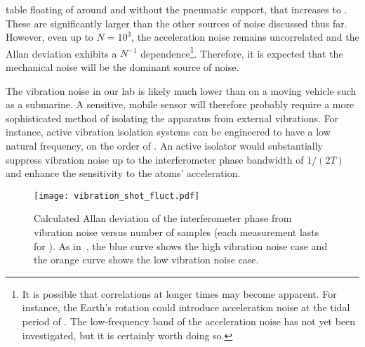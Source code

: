 table floating of around  and without the
pneumatic support, that increases to
. These are significantly larger than the other sources of noise discussed thus
far. However, even up to $N = 10^3$, the acceleration noise remains uncorrelated and
the Allan deviation exhibits a $N^{-1}$
dependence\footnote{It is possible that correlations at longer times may
become apparent. For instance, the Earth's rotation could introduce
acceleration noise at the tidal period of . The
low-frequency band of the acceleration noise has not yet been investigated, but it is certainly worth
doing so.}. Therefore, it is expected that the mechanical noise will be
the dominant source of noise.  
\par\noindent
The vibration noise in our lab is likely much lower than on a
moving vehicle such as a submarine. 
A sensitive, mobile sensor will therefore probably require a more sophisticated
method of isolating the apparatus from external vibrations. For
instance, active
vibration isolation systems can be engineered to have a low natural
frequency, on the order of
\cite{Zhou2012}. An active isolator would
substantially suppress vibration noise up to the interferometer phase
bandwidth of $1/(2T)$ and enhance the sensitivity to the atoms'
acceleration.
\begin{figure}[htpb]
  \centering
  \texttt{[image: vibration\_shot\_fluct.pdf]}
  \caption[Calculated Allan deviation of the interferometer phase from vibration
  noise.]{Calculated
    Allan deviation of the interferometer phase from vibration noise
    versus number of samples (each measurement lasts for
    ). As in~, the blue curve
shows the high vibration noise case and the orange curve shows the low
vibration noise case.}
  \label{fig:vibration_shot_fluct}
\end{figure}
